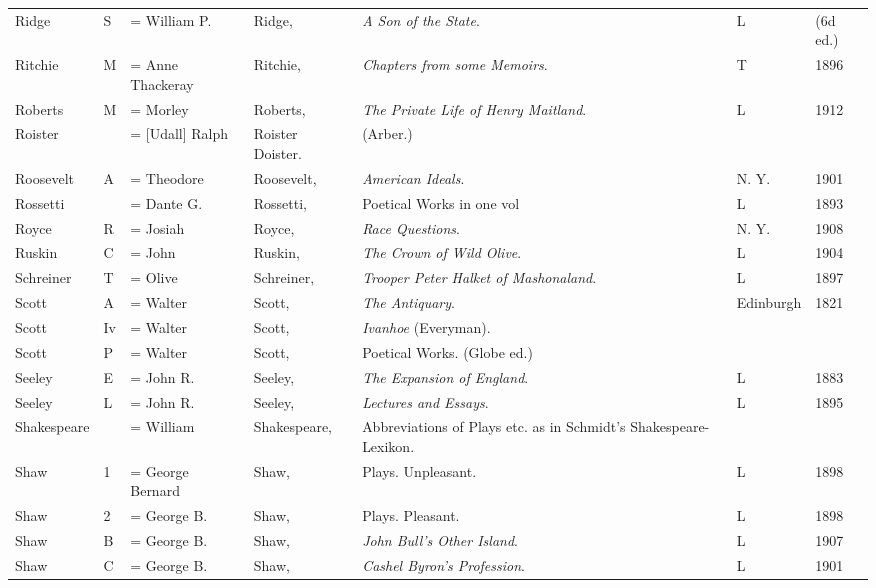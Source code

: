 \begin{sidewaystable}
\centering
\begin{tabular}{p{} p{} p{} p{} p{} p{} p{}}
Ridge & S & = William P. & Ridge, & \textit{A Son of the State}. & L & (6d ed.) \\
Ritchie & M & = Anne Thackeray & Ritchie, & \textit{Chapters from some Memoirs}. & T & 1896 \\
Roberts & M & = Morley & Roberts, & \textit{The Private Life of Henry Maitland}. & L & 1912 \\
Roister & & = [Udall] Ralph & Roister Doister. & (Arber.) & \\
Roosevelt & A & = Theodore & Roosevelt, & \textit{American Ideals}. & N. Y. & 1901 \\
Rossetti & & = Dante G. & Rossetti, & Poetical Works in one vol & L & 1893 \\
Royce & R & = Josiah & Royce, & \textit{Race Questions}. & N. Y. & 1908 \\
Ruskin & C & = John & Ruskin, & \textit{The Crown of Wild Olive}. & L & 1904 \\Schreiner & T & = Olive & Schreiner, & \textit{Trooper Peter Halket of Mashonaland}. & L & 1897 \\
Scott & A & = Walter & Scott, & \textit{The Antiquary}. & Edinburgh & 1821 \\
Scott& Iv & = Walter & Scott, & \textit{Ivanhoe} (Everyman). & & \\
Scott& P & = Walter & Scott, & Poetical Works. (Globe ed.) & & \\Seeley & E & = John R. & Seeley, & \textit{The Expansion of England}. & L & 1883 \\
Seeley& L & = John R. & Seeley, & \textit{Lectures and Essays}. & L & 1895 \\
Shakespeare & & = William & Shakespeare, & Abbreviations of Plays etc. as in Schmidt's Shakespeare-Lexikon. & & \\
Shaw & 1 & = George Bernard & Shaw, & Plays. Unpleasant. & L & 1898 \\
Shaw& 2 & = George B. & Shaw, & Plays. Pleasant. & L & 1898 \\
Shaw& B & = George B. & Shaw, & \textit{John Bull's Other Island}. & L & 1907 \\
Shaw& C & = George B. & Shaw, & \textit{Cashel Byron's Profession}. & L & 1901 \\
\end{tabular}
\end{sidewaystable}

